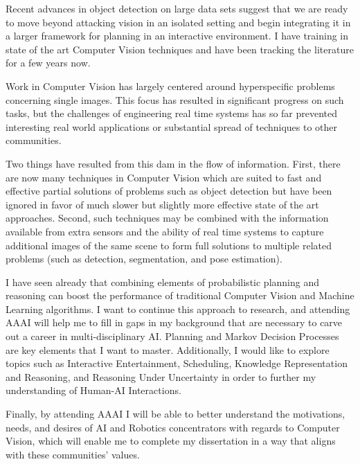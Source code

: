 \documentclass[12pt]{article}
\numberwithin{equation}{section}
\numberwithin{table}{section}
\numberwithin{figure}{section}
\begin{document}
  Recent advances in object detection on large data sets suggest that we are ready
to move beyond attacking vision in an isolated setting and begin integrating it in a
larger framework for planning in an interactive environment. I have training in state
of the art Computer Vision techniques and have been tracking the literature for a few
years now. 

  Work in Computer Vision has largely centered around hyperspecific problems concerning
single images. This focus has resulted in significant progress on such tasks, but the challenges of 
engineering real time systems has so far prevented interesting real world applications
or substantial spread of techniques to other communities. 

Two things have resulted from this dam in the flow of information. 
First, there are now many techniques in Computer Vision which are suited
to fast and effective partial solutions of problems such as object detection
but have been ignored in favor of much slower but slightly more effective state of the art
approaches.  Second, such techniques may be combined with the information available from
extra sensors and the ability of real time systems to capture additional images of the same scene
to form full solutions to multiple related problems (such as detection, segmentation, and pose estimation). 
 
I have seen already that combining elements of probabilistic planning and reasoning can boost
the performance of traditional Computer Vision and Machine Learning algorithms.  I want to
continue this approach to research, and attending AAAI will help me to fill in gaps in my
background that are necessary to carve out a career in multi-disciplinary AI.  
Planning and Markov Decision Processes are key elements that I want to master. Additionally,
I would like to explore topics such as Interactive Entertainment, Scheduling, Knowledge
Representation and Reasoning, and Reasoning Under Uncertainty in order to further my
understanding of Human-AI Interactions.

Finally, by attending AAAI I will be able to better understand the motivations, needs, and desires 
of AI and Robotics concentrators with regards to Computer Vision, which will enable me 
to complete my dissertation in a way that aligns with these communities' values.

\newpage
\end{document}
